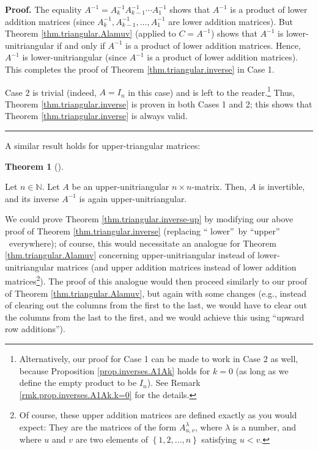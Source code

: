 \documentclass[numbers=enddot,12pt,final,onecolumn,notitlepage]{scrartcl}%
\theoremstyle{definition}
\newtheorem{theo}{Theorem}[section]
\newenvironment{theorem}[1][]
{\begin{theo}[#1]\begin{leftbar}}
{\end{leftbar}\end{theo}}
\newenvironment{proof}[1][Proof]{\noindent\textbf{#1.} }{\ \rule{0.5em}{0.5em}}
\begin{document}
\begin{proof}
The equality $A^{-1}=A_{k}^{-1}A_{k-1}^{-1}\cdots A_{1}^{-1}$ shows that
$A^{-1}$ is a product of lower addition matrices (since $A_{k}^{-1}%
,A_{k-1}^{-1},\ldots,A_{1}^{-1}$ are lower addition matrices). But Theorem
\ref{thm.triangular.Alamuv} (applied to $C=A^{-1}$) shows that $A^{-1}$ is
lower-unitriangular if and only if $A^{-1}$ is a product of lower addition
matrices. Hence, $A^{-1}$ is lower-unitriangular (since $A^{-1}$ is a product
of lower addition matrices). This completes the proof of Theorem
\ref{thm.triangular.inverse} in Case 1.

Case 2 is trivial (indeed, $A=I_{n}$ in this case) and is left to the
reader.\footnote{Alternatively, our proof for Case 1 can be made to work in
Case 2 as well, because Proposition \ref{prop.inverses.A1Ak} holds for $k=0$
(as long as we define the empty product to be $I_{n}$). See Remark
\ref{rmk.prop.inverses.A1Ak.k=0} for the details.} Thus, Theorem
\ref{thm.triangular.inverse} is proven in both Cases 1 and 2; this shows that
Theorem \ref{thm.triangular.inverse} is always valid.
\end{proof}

A similar result holds for upper-triangular matrices:

\begin{theorem}
\label{thm.triangular.inverse-up}Let $n\in\mathbb{N}$. Let $A$ be an
upper-unitriangular $n\times n$-matrix. Then, $A$ is invertible, and its
inverse $A^{-1}$ is again upper-unitriangular.
\end{theorem}

We could prove Theorem \ref{thm.triangular.inverse-up} by modifying our above
proof of Theorem \ref{thm.triangular.inverse} (replacing \textquotedblleft
lower\textquotedblright\ by \textquotedblleft upper\textquotedblright%
\ everywhere); of course, this would necessitate an analogue for Theorem
\ref{thm.triangular.Alamuv} concerning upper-unitriangular instead of
lower-unitriangular matrices (and upper addition matrices instead of lower
addition matrices\footnote{Of course, these upper addition matrices are
defined exactly as you would expect: They are the matrices of the form
$A_{u,v}^{\lambda}$, where $\lambda$ is a number, and where $u$ and $v$ are
two elements of $\left\{  1,2,\ldots,n\right\}  $ satisfying $u<v$.}). The
proof of this analogue would then proceed similarly to our proof of Theorem
\ref{thm.triangular.Alamuv}, but again with some changes (e.g., instead of
clearing out the columns from the first to the last, we would have to clear
out the columns from the last to the first, and we would achieve this using
\textquotedblleft upward row additions\textquotedblright).
\end{document}
